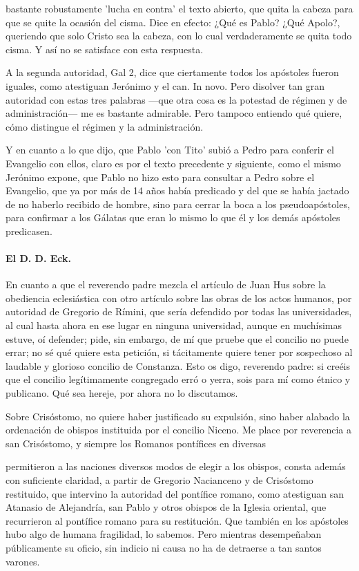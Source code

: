 bastante robustamente 'lucha en contra' el texto abierto, que quita la cabeza para que se quite la ocasión del cisma. Dice en efecto: ¿Qué es Pablo? ¿Qué Apolo?, queriendo que solo Cristo sea la cabeza, con lo cual verdaderamente se quita todo cisma. Y así no se satisface con esta respuesta.

\marginpar{\small[311]} A la segunda autoridad, Gal 2, dice que ciertamente todos los apóstoles fueron iguales, como atestiguan Jerónimo y el can. In novo. Pero disolver tan gran autoridad con estas tres palabras —que otra cosa es la potestad de régimen y de administración— me es bastante admirable. Pero tampoco entiendo qué quiere, cómo distingue el régimen y la administración.

Y en cuanto a lo que dijo, que Pablo 'con Tito' subió a Pedro para conferir el Evangelio con ellos, claro es por el texto precedente y siguiente, como el mismo Jerónimo expone, que Pablo no hizo esto para consultar a Pedro sobre el Evangelio, que ya por más de 14 años había predicado y del que se había jactado de no haberlo recibido de hombre, sino para cerrar la boca a los pseudoapóstoles, para confirmar a los Gálatas que eran lo mismo lo que él y los demás apóstoles predicasen.

\paragraph*{El D. D. Eck.}

En cuanto a que el reverendo padre mezcla el artículo de Juan Hus sobre la obediencia eclesiástica con otro artículo sobre las obras de los actos humanos, por autoridad de Gregorio de Rímini, que sería defendido por todas las universidades, al cual hasta ahora en ese lugar en ninguna universidad, aunque en muchísimas estuve, oí defender; pide, sin embargo, de mí que pruebe que el concilio no puede errar; no sé qué quiere esta petición, si tácitamente quiere tener por sospechoso al laudable y glorioso concilio de Constanza. Esto os digo, reverendo padre: si creéis que el concilio legítimamente congregado erró o yerra, sois para mí como étnico y publicano. Qué sea hereje, por ahora no lo discutamos.

Sobre Crisóstomo, no quiere haber justificado su expulsión, sino haber alabado la ordenación de obispos instituida por el concilio Niceno. Me place por reverencia a san Crisóstomo, y siempre los Romanos pontífices en diversas

permitieron a las naciones diversos modos de elegir a los obispos, consta además con suficiente claridad, a partir de Gregorio Nacianceno y de Crisóstomo restituido, que intervino la autoridad del pontífice romano, como atestiguan san Atanasio de Alejandría, san Pablo y otros obispos de la Iglesia oriental, que recurrieron al pontífice romano para su restitución. Que también en los apóstoles hubo algo de humana fragilidad, lo sabemos. Pero mientras desempeñaban públicamente su oficio, sin indicio ni causa no ha de detraerse a tan santos varones.

